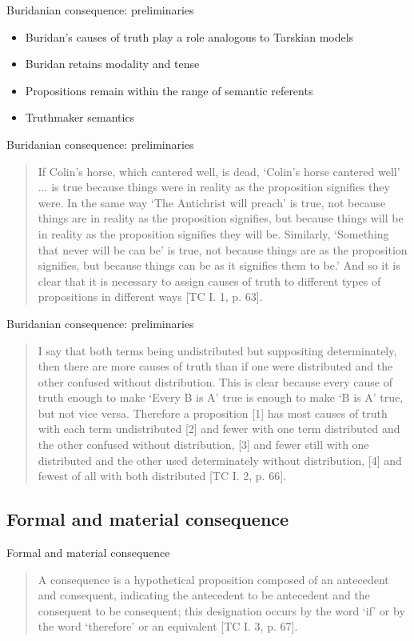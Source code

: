 \documentclass{beamer}
\begin{document}
\begin{frame}{Buridanian consequence: preliminaries}
	\begin{itemize}
		\item Buridan's causes of truth play a role analogous to Tarskian models
		\pause 
		\item Buridan retains modality and tense
		\pause 
		\item Propositions remain within the range of semantic referents
		\pause 
		\item Truthmaker semantics
	\end{itemize}
\end{frame}

\begin{frame}{Buridanian consequence: preliminaries}
	\begin{quote}
		If Colin's horse, which cantered well, is dead, `Colin's horse cantered well' ... is true because things were in reality as the proposition signifies they were. In the same way `The Antichrist will preach' is true, not because things are in reality as the proposition signifies, but because things will be in reality as the proposition signifies they will be. Similarly, `Something that never will be can be' is true, not because things are as the proposition signifies, but because things can be as it signifies them to be.' And so it is clear that it is necessary to assign causes of truth to different types of propositions in different ways [TC I. 1, p. 63].
	\end{quote}
\end{frame}

\begin{frame}{Buridanian consequence: preliminaries}
	\begin{quote}
		I say that both terms being undistributed but suppositing determinately, then there are more causes of truth than if one were distributed and the other confused without distribution. This is clear because every cause of truth enough to make `Every B is A' true is enough to make `B is A' true, but not vice versa. Therefore a proposition [1] has most causes of truth with each term undistributed [2] and fewer with one term distributed and the other confused without distribution, [3] and fewer still with one distributed and the other used determinately without distribution, [4] and fewest of all with both distributed [TC I. 2, p. 66].
	\end{quote}
\end{frame}
\subsection{Formal and material consequence}
\begin{frame}{Formal and material consequence}
	\begin{quote}
		A consequence is a hypothetical proposition composed of an antecedent and consequent, indicating the antecedent to be antecedent and the consequent to be consequent; this designation occurs by the word `if' or by the word `therefore' or an equivalent [TC I. 3, p. 67].
	\end{quote}
\end{frame}
\end{document}
